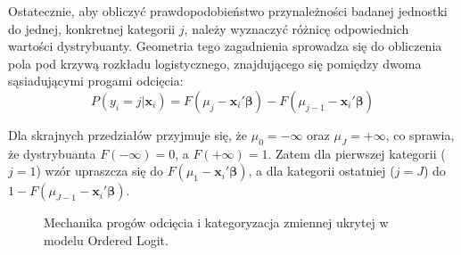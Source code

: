Ostatecznie, aby obliczyć prawdopodobieństwo przynależności badanej jednostki do jednej, konkretnej kategorii $j$, należy wyznaczyć różnicę odpowiednich wartości dystrybuanty. Geometria tego zagadnienia sprowadza się do obliczenia pola pod krzywą rozkładu logistycznego, znajdującego się pomiędzy dwoma sąsiadującymi progami odcięcia:
\begin{equation}
    P(y_i = j | \mathbf{x}_i) = F(\mu_j - \mathbf{x}_i' \boldsymbol{\beta}) - F(\mu_{j-1} - \mathbf{x}_i' \boldsymbol{\beta})
\end{equation}

Dla skrajnych przedziałów przyjmuje się, że $\mu_0 = -\infty$ oraz $\mu_J = +\infty$, co sprawia, że dystrybuanta $F(-\infty) = 0$, a $F(+\infty) = 1$. Zatem dla pierwszej kategorii ($j=1$) wzór upraszcza się do $F(\mu_1 - \mathbf{x}_i' \boldsymbol{\beta})$, a dla kategorii ostatniej ($j=J$) do $1 - F(\mu_{J-1} - \mathbf{x}_i' \boldsymbol{\beta})$.

\begin{figure}[htbp]
    \centering
    \caption{Mechanika progów odcięcia i kategoryzacja zmiennej ukrytej w modelu Ordered Logit.}
    \label{fig:ordered_logit_plot}
\end{figure}

